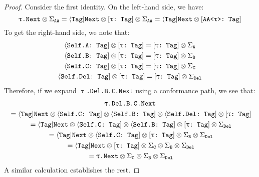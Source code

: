 \documentclass[../generics]{subfiles}
\begin{document}
\begin{proof}
Consider the first identity. On the left-hand side, we have:
\[
\TNext \otimes \SigmaAA = \AssocTypeNext \otimes \ConfTTag \otimes \SigmaAA = \AssocTypeNext \otimes \ConfAATag
\]
To get the right-hand side, we note that:
\begin{gather*}
\AssocConfATag \otimes \ConfTTag = \ConfTTag \otimes \SigmaA \\
\AssocConfBTag \otimes \ConfTTag = \ConfTTag \otimes \SigmaB \\
\AssocConfCTag \otimes \ConfTTag = \ConfTTag \otimes \SigmaC \\
\AssocConfDelTag \otimes \ConfTTag = \ConfTTag \otimes \SigmaDel
\end{gather*}
Therefore, if we expand \texttt{$\uptau$.Del.B.C.Next} using a conformance path, we see that:
\begin{gather*}
\texttt{$\uptau$.Del.B.C.Next}\\
{} = \AssocTypeNext \otimes \AssocConfCTag \otimes \AssocConfBTag \otimes \AssocConfDelTag \otimes \ConfTTag\\
{} = \AssocTypeNext \otimes \AssocConfCTag \otimes \AssocConfBTag \otimes \ConfTTag \otimes \SigmaDel \\
{} = \AssocTypeNext \otimes \AssocConfCTag \otimes \ConfTTag \otimes \SigmaB \otimes \SigmaDel \\
{} = \AssocTypeNext \otimes \ConfTTag \otimes \SigmaC \otimes \SigmaB \otimes \SigmaDel \\
{} = \TNext \otimes \SigmaC \otimes \SigmaB \otimes \SigmaDel
\end{gather*}
A similar calculation establishes the rest.
\end{proof}
\end{document}
